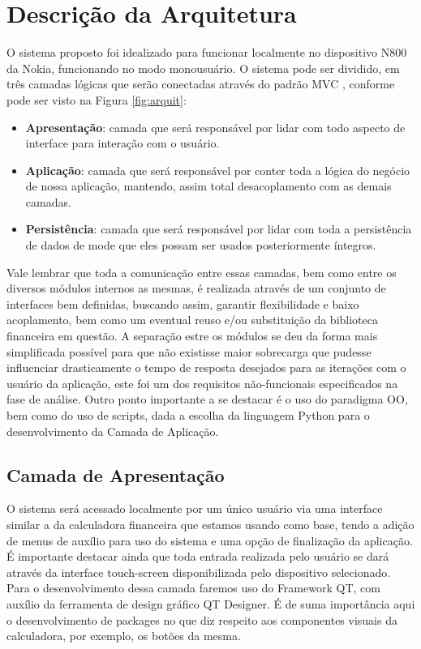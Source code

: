 \section{Descrição da Arquitetura}
O sistema proposto foi idealizado para funcionar localmente no dispositivo N800 da Nokia, funcionando no modo monousuário. O sistema pode ser dividido, em três camadas lógicas que serão conectadas através do padrão MVC \cite{mvc}, conforme pode ser visto na Figura \ref{fig:arquit}:
\begin{itemize}
 \item \textbf{Apresentação}: camada que será responsável por lidar com todo aspecto de interface para interação com o usuário.
 \item \textbf{Aplicação}: camada que será responsável por conter toda a lógica do negócio de nossa aplicação, mantendo, assim total desacoplamento com as demais camadas.
 \item \textbf{Persistência}: camada que será responsável por lidar com toda a persistência de dados de mode que eles possam ser usados posteriormente íntegros.
\end{itemize}

Vale lembrar que toda a comunicação entre essas camadas, bem como entre os diversos módulos internos as mesmas, é realizada através de um conjunto de interfaces bem definidas, buscando assim, garantir flexibilidade e baixo acoplamento, bem como um eventual reuso e/ou substituição da biblioteca financeira em questão. A separação estre os módulos se deu da forma mais simplificada possível para que não existisse maior sobrecarga que pudesse influenciar drasticamente o tempo de resposta desejados para as iterações com o usuário da aplicação, este foi um dos requisitos não-funcionais especificados na fase de análise.
Outro ponto importante a se destacar é o uso do paradigma OO, bem como do uso de scripts, dada a escolha da linguagem Python para o desenvolvimento da Camada de Aplicação.

\subsection{Camada de Apresentação}
O sistema será acessado localmente por um único usuário via uma interface similar a da calculadora financeira que estamos usando como base, tendo a adição de menus de auxílio para uso do sistema e uma opção de finalização da aplicação. É importante destacar ainda que toda entrada realizada pelo usuário se dará através da interface touch-screen disponibilizada pelo dispositivo selecionado.
Para o desenvolvimento dessa camada faremos uso do Framework QT, com auxílio da ferramenta de design gráfico QT Designer. É de suma importância aqui o desenvolvimento de packages no que diz respeito aos componentes visuais da calculadora, por exemplo, os botões da mesma.

